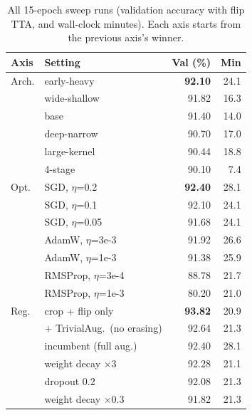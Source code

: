\documentclass[letterpaper]{article} %
\begin{document}
\begin{table}[t]
\centering
\small
\setlength{\tabcolsep}{4pt}
\begin{tabular}{llrr}
\toprule
Axis & Setting & Val (\%) & Min \\
\midrule
Arch. & early-heavy           & \textbf{92.10} & 24.1 \\
      & wide-shallow          & 91.82 & 16.3 \\
      & base                  & 91.40 & 14.0 \\
      & deep-narrow           & 90.70 & 17.0 \\
      & large-kernel          & 90.44 & 18.8 \\
      & 4-stage               & 90.10 & 7.4 \\
\midrule
Opt.  & SGD, $\eta$=0.2       & \textbf{92.40} & 28.1 \\
      & SGD, $\eta$=0.1       & 92.10 & 24.1 \\
      & SGD, $\eta$=0.05      & 91.68 & 24.1 \\
      & AdamW, $\eta$=3e-3    & 91.92 & 26.6 \\
      & AdamW, $\eta$=1e-3    & 91.38 & 25.9 \\
      & RMSProp, $\eta$=3e-4  & 88.78 & 21.7 \\
      & RMSProp, $\eta$=1e-3  & 80.20 & 21.0 \\
\midrule
Reg.  & crop + flip only      & \textbf{93.82} & 20.9 \\
      & + TrivialAug.\ (no erasing) & 92.64 & 21.3 \\
      & incumbent (full aug.) & 92.40 & 28.1 \\
      & weight decay $\times3$ & 92.28 & 21.1 \\
      & dropout 0.2           & 92.08 & 21.3 \\
      & weight decay $\times0.3$ & 91.82 & 21.3 \\
\bottomrule
\end{tabular}
\caption{All 15-epoch sweep runs (validation accuracy with flip TTA, and wall-clock minutes). Each axis starts from the previous axis's winner.}
\label{tab:sweep}
\end{table}
\end{document}
